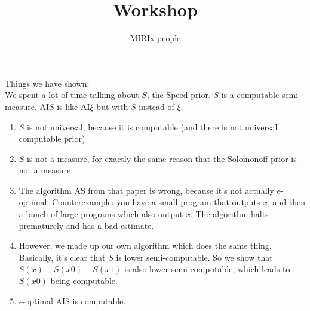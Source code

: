 \documentclass[11pt]{amsart}
\title{Workshop}
\author{MIRIx people}
\begin{document}
\maketitle

Things we have shown:\\

We spent a lot of time talking about $S$, the Speed prior. $S$ is a computable semi-measure. AI$S$ is like AI$\xi$ but with $S$ instead of $\xi$.\\

\begin{enumerate}
\item $S$ is not universal, because it is computable (and there is not universal computable prior)
\item $S$ is not a measure, for exactly the same reason that the Solomonoff prior is not a measure
\item The algorithm AS from that paper is wrong, because it's not actually $\epsilon$-optimal. Counterexample: you have a small program that outputs $x$, and then a bunch of large programs which also output $x$. The algorithm halts prematurely and has a bad estimate.
\item However, we made up our own algorithm which does the same thing. Basically, it's clear that $S$ is lower semi-computable. So we show that $S(x)- S(x0) - S(x1)$ is also lower semi-computable, which leads to $S(x0)$ being computable.
\item $\epsilon$-optimal AIS is computable.
\end{enumerate}
\end{document}
